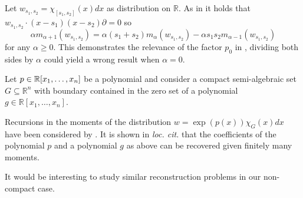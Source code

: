 \begin{example}
  Let $w_{s_1,s_2} = \chi_{[s_1,s_2]}(x)dx$ as distribution on $\mathbb{R}$.
  As in  it holds that $w_{s_1,s_2}\cdot (x-s_1)(x-s_2) \partial =0$ so
  $$\alpha m_{\alpha +1}(w_{s_1,s_2}) = \alpha (s_1 + s_2)m_{\alpha}(w_{s_1,s_2}) - \alpha s_1 s_2 m_{\alpha-1}(w_{s_1,s_2})$$
  for any $\alpha \geq 0$.
  This demonstrates the relevance of the factor $p_0$ in , dividing both sides by $\alpha$ could yield a wrong result when $\alpha = 0$.
\end{example}
\begin{remark}
  Let $p\in \mathbb{R}[x_1,\ldots,x_n]$ be a polynomial and consider a compact semi-algebraic set $G\subseteq \mathbb{R}^n$ with boundary contained in the zero set of a polynomial $g\in \mathbb{R}[x_1,\ldots,x_n]$.

  Recursions in the moments of the distribution $w = \exp(p(x)) \chi_G(x) dx$ have been considered by \cite{brehard2019moment}.
  It is shown in {\it loc. cit.} that the coefficients of the polynomial $p$ and a polynomial $g$ as above can be recovered given finitely many moments.

  It would be interesting to study similar reconstruction problems in our non-compact case.
\end{remark}
